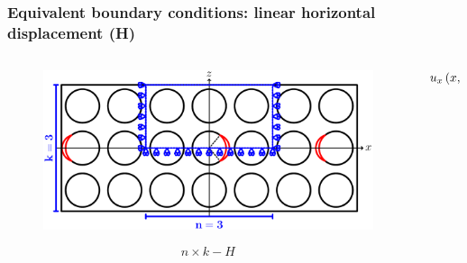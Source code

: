 \documentclass[first,firstsupp,lastsupp,last,hyperref,table]{ETHclass}
\begin{document}
\begin{frame}
\frametitle{\vspace{0.2cm}\small Equivalent boundary conditions: linear horizontal displacement (H)}
\vspace{-1.25cm}
\centering
\begin{columns}[c]
\begin{column}{0.5\textwidth}
\centering
\begin{figure}
\centering
\includegraphics[width=\columnwidth]{freeThickPly.pdf}
\end{figure}
\vspace{-0.25cm}
\begin{equation*}
n\times k-H
\end{equation*}
\end{column}
\begin{column}{0.5\textwidth}
\centering
\begin{equation*}
\scriptsize
u_{x}\left(x,h\right)=\bar{\varepsilon}_{x}x
\end{equation*}
\end{column}
\end{columns}
\end{frame}
\end{document}
